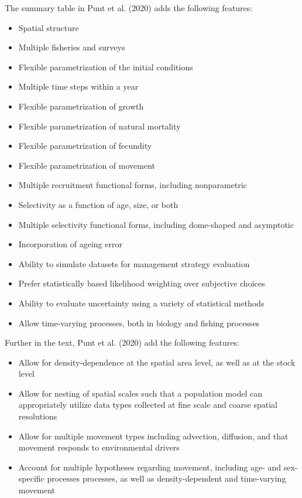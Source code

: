 \documentclass{SCreport}
\begin{document}
\newpage

The summary table in Punt et al. (2020) adds the following features:

\begin{itemize}
  \item Spatial structure
  \item Multiple fisheries and surveys
  \item Flexible parametrization of the initial conditions
  \item Multiple time steps within a year
  \item Flexible parametrization of growth
  \item Flexible parametrization of natural mortality
  \item Flexible parametrization of fecundity
  \item Flexible parametrization of movement
  \item Multiple recruitment functional forms, including nonparametric
  \item Selectivity as a function of age, size, or both
  \item Multiple selectivity functional forms, including dome-shaped and
  asymptotic
  \item Incorporation of ageing error
  \item Ability to simulate datasets for management strategy evaluation
  \item Prefer statistically based likelihood weighting over subjective choices
  \item Ability to evaluate uncertainty using a variety of statistical methods
  \item Allow time-varying processes, both in biology and fishing processes
\end{itemize}

\vspace{2ex}

Further in the text, Punt et al. (2020) add the following features:

\begin{itemize}
  \item Allow for density-dependence at the spatial area level, as well as at
  the stock level
  \item Allow for nesting of spatial scales such that a population model can
  appropriately utilize data types collected at fine scale and coarse spatial
  resolutions
  \item Allow for multiple movement types including advection, diffusion, and
  that movement responds to environmental drivers
  \item Account for multiple hypotheses regarding movement, including age- and
  sex-specific processes processes, as well as density-dependent and
  time-varying movement
\end{itemize}
\end{document}
